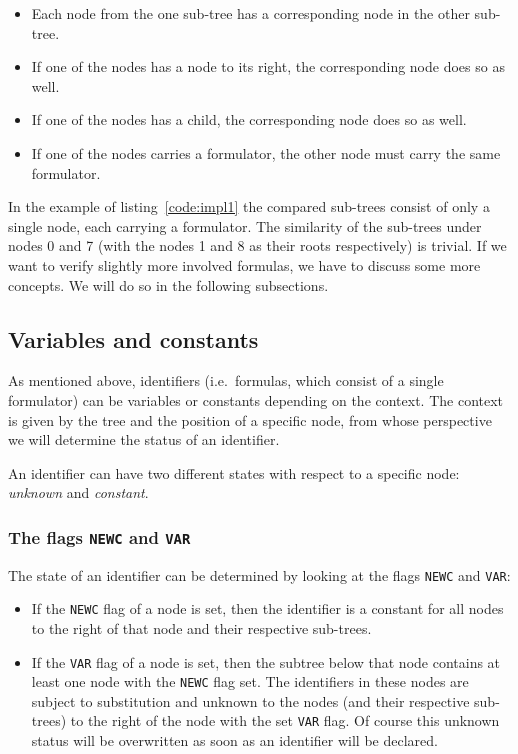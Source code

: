 \documentclass[british]{article}
\begin{document}
\begin{itemize}
	\item 
		Each node from the one sub-tree has a corresponding node in the other
		sub-tree.
	\item
		If one of the nodes has a node to its right, the corresponding node does
		so as well.
	\item
		If one of the nodes has a child, the corresponding node does so as well.
	\item
		If one of the nodes carries a formulator, the other node must carry the
		same formulator.
\end{itemize}

In the example of listing~\ref{code:impl1} the compared sub-trees consist of
only a single node, each carrying a formulator. The similarity of the sub-trees
under nodes 0 and 7 (with the nodes 1 and 8 as their roots respectively) is
trivial. If we want to verify slightly more involved formulas, we have to
discuss some more concepts. We will do so in the following subsections.

\subsection{Variables and constants}\label{sec:var}

As mentioned above, identifiers (i.e.\ formulas, which consist of a single
formulator) can be variables or constants depending on the context. The context
is given by the tree and the position of a specific node, from whose
perspective we will determine the status of an identifier.

\medskip{}
An identifier can have two different states with respect to a specific node:
\emph{unknown} and \emph{constant}.

\subsubsection{The flags \texttt{NEWC} and \texttt{VAR}}
The state of an identifier can be determined by looking at the flags
\texttt{NEWC} and \texttt{VAR}:

\begin{itemize}
	\item 
		If the \texttt{NEWC} flag of a node is set, then the identifier is a
		constant for all nodes to the right of that node and their respective
		sub-trees.
	\item
		If the \texttt{VAR} flag of a node is set, then the subtree below that
		node contains at least one node with the \texttt{NEWC} flag set. The
		identifiers in these nodes are subject to substitution and unknown to
		the nodes (and their respective sub-trees) to the right of the node with
		the set \texttt{VAR} flag. Of course this unknown status will be
		overwritten as soon as an identifier will be declared.
\end{itemize}
\end{document}
